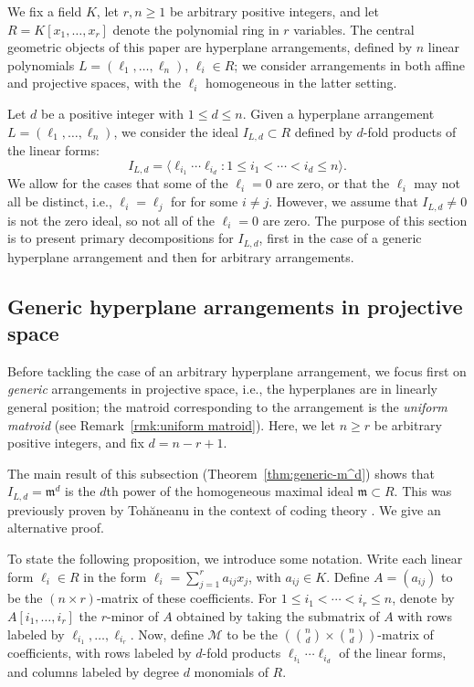 \documentclass [a4paper,reqno, 11pt]{amsart}
\theoremstyle{plain}
\theoremstyle{plain}
\theoremstyle{plain}
\theoremstyle{plain}
\theoremstyle{definition}
\theoremstyle{definition}
\theoremstyle{definition}
\theoremstyle{definition}
\theoremstyle{definition}
\theoremstyle{definition}
\newcommand{\calM}{\mathcal{M}}
\begin{document}
We fix a field $K$, let $r,n\geq 1$ be arbitrary positive integers, and let $R=K[x_1,\ldots,x_r]$ denote the polynomial ring in $r$ variables. The central geometric objects of this paper are hyperplane arrangements, defined by $n$ linear polynomials $L=(\ell_1,\ldots,\ell_n)$, $\ell_i\in R$; we consider arrangements in both affine and projective spaces, with the $\ell_i$ homogeneous in the latter setting.

Let $d$ be a positive integer with $1\leq d\leq n$. Given a hyperplane arrangement $L=(\ell_1,\ldots,\ell_n)$, we consider the ideal $I_{L,d}\subset R$ defined by $d$-fold products of the linear forms:
\begin{equation*}
I_{L,d}=\langle\ell_{i_1}\cdots\ell_{i_d}:1\leq i_1<\cdots<i_d\leq n\rangle.
\end{equation*}
We allow for the cases that some of the $\ell_i=0$ are zero, or that the $\ell_i$ may not all be distinct, i.e., $\ell_i=\ell_j$ for for some $i\neq j$. However, we assume that $I_{L,d}\neq 0$ is not the zero ideal, so not all of the $\ell_i=0$ are zero. The purpose of this section is to present primary decompositions for $I_{L,d}$, first in the case of a generic hyperplane arrangement and then for arbitrary arrangements.

\subsection{Generic hyperplane arrangements in projective space}\label{subsec:generic primary decomp}

Before tackling the case of an arbitrary hyperplane arrangement, we focus first on \emph{generic} arrangements in projective space, i.e., the hyperplanes are in linearly general position; the matroid corresponding to the arrangement is the \emph{uniform matroid} (see Remark~\ref{rmk:uniform matroid}).
Here, we let $n\geq r$ be arbitrary positive integers, and fix $d=n-r+1$.

The main result of this subsection (Theorem~\ref{thm:generic-m^d}) shows that $I_{L,d}=\mathfrak{m}^d$ is the $d$th power of the homogeneous maximal ideal $\mathfrak{m}\subset R$. This was previously proven by Toh\u{a}neanu in the context of coding theory \cite[Theorem 3.1]{Toh}. We give an alternative proof.

To state the following proposition, we introduce some notation. Write each linear form $\ell_i\in R$ in the form $\ell_i=\sum_{j=1}^r a_{ij}x_j$, with $a_{ij}\in K$. Define $A=(a_{ij})$ to be the $(n\times r)$-matrix of these coefficients. For $1\leq i_1<\cdots<i_r\leq n$, denote by $A[i_1,\ldots, i_r]$ the $r$-minor of $A$ obtained by taking the submatrix of $A$ with rows labeled by $\ell_{i_1},\ldots,\ell_{i_r}$. Now, define $\calM$ to be the $(\binom{n}{d}\times\binom{n}{d})$-matrix of coefficients, with rows labeled by $d$-fold products $\ell_{i_1}\cdots\ell_{i_d}$ of the linear forms, and columns labeled by degree $d$ monomials of $R$.
\end{document}
